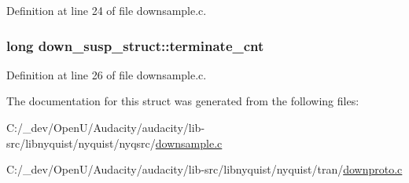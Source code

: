 Definition at line 24 of file downsample.\+c.

\subsubsection[{\texorpdfstring{terminate\+\_\+cnt}{terminate_cnt}}]{\setlength{\rightskip}{0pt plus 5cm}long down\+\_\+susp\+\_\+struct\+::terminate\+\_\+cnt}\hypertarget{structdown__susp__struct_a601adcbfe00e224ca758eaa4e52ee34a}{}\label{structdown__susp__struct_a601adcbfe00e224ca758eaa4e52ee34a}


Definition at line 26 of file downsample.\+c.



The documentation for this struct was generated from the following files\+:\begin{DoxyCompactItemize}
\item 
C\+:/\+\_\+dev/\+Open\+U/\+Audacity/audacity/lib-\/src/libnyquist/nyquist/nyqsrc/\hyperlink{downsample_8c}{downsample.\+c}\item 
C\+:/\+\_\+dev/\+Open\+U/\+Audacity/audacity/lib-\/src/libnyquist/nyquist/tran/\hyperlink{downproto_8c}{downproto.\+c}\end{DoxyCompactItemize}
